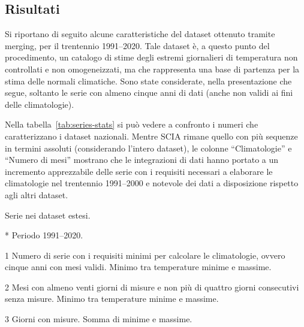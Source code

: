 \subsection{Risultati}\label{ch:results}
Si riportano di seguito alcune caratteristiche del dataset ottenuto tramite merging, per il trentennio 1991--2020. Tale dataset è, a questo punto del procedimento, un catalogo di stime degli estremi giornalieri di temperatura non controllati e non omogeneizzati, ma che rappresenta una base di partenza per la stima delle normali climatiche. Sono state considerate, nella presentazione che segue, soltanto le serie con almeno cinque anni di dati (anche non validi ai fini delle climatologie).

Nella tabella~\ref{tab:series-stats} si può vedere a confronto i numeri che caratterizzano i dataset nazionali. Mentre SCIA rimane quello con più sequenze in termini assoluti (considerando l'intero dataset), le colonne ``Climatologie'' e ``Numero di mesi'' mostrano che le integrazioni di dati hanno portato a un incremento apprezzabile delle serie con i requisiti necessari a elaborare le climatologie nel trentennio 1991--2000 e notevole dei dati a disposizione rispetto agli altri dataset.

\begin{table}[ht]
  \centering
  \begin{threeparttable}
    \caption{Serie nei dataset estesi.}\label{tab:series-stats}
    \scriptsize
    
    \begin{tablenotes}
    \item [*] Periodo 1991--2020.
    \item [1] Numero di serie con i requisiti minimi per calcolare le climatologie, ovvero cinque anni con mesi validi. Minimo tra temperature minime e massime.
    \item [2] Mesi con almeno venti giorni di misure e non più di quattro giorni consecutivi senza misure. Minimo tra temperature minime e massime.
    \item [3] Giorni con misure. Somma di minime e massime.
    \end{tablenotes}
  \end{threeparttable}
\end{table}

